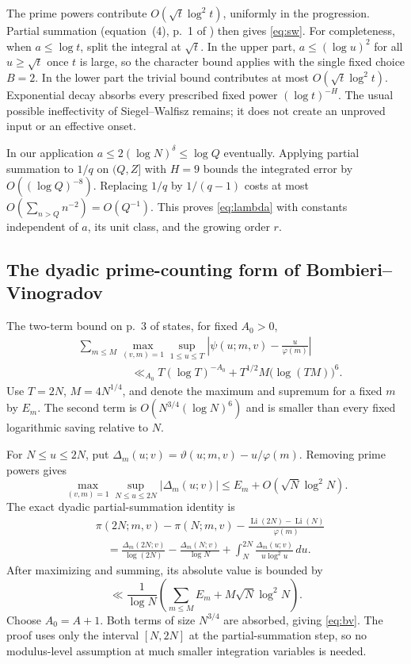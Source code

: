 \documentclass[11pt]{article}
\theoremstyle{remark}\newtheorem{remark}[theorem]{Remark}
\newcommand{\Li}{\operatorname{Li}}
\begin{document}
The prime powers contribute $O(\sqrt t\log^2t)$, uniformly in the
progression. Partial summation (equation~(4), p.~1 of \cite{VaughanBV})
then gives \eqref{eq:sw}. For completeness, when $a\le\log t$, split
the integral at $\sqrt t$. In the upper part, $a\le(\log u)^2$ for
all $u\ge\sqrt t$ once $t$ is large, so the character bound applies
with the single fixed choice $B=2$. In the lower part the trivial bound
contributes at most $O(\sqrt t\log^2t)$. Exponential decay absorbs
every prescribed fixed power $(\log t)^{-H}$. The usual possible
ineffectivity of Siegel--Walfisz remains; it does not create an unproved
input or an effective onset.

In our application $a\le2(\log N)^\delta\le\log Q$ eventually.
Applying partial summation to $1/q$ on $(Q,Z]$ with $H=9$ bounds the
integrated error by $O((\log Q)^{-8})$. Replacing $1/q$ by
$1/(q-1)$ costs at most $O(\sum_{n>Q}n^{-2})=O(Q^{-1})$.
This proves \eqref{eq:lambda} with constants independent of $a$, its
unit class, and the growing order $r$.

\subsection{The dyadic prime-counting form of Bombieri--Vinogradov}
The two-term bound on p.~3 of \cite{VaughanBV} states, for fixed $A_0>0$,
\begin{align*}
 &\sum_{m\le M}\max_{(v,m)=1}\sup_{1\le u\le T}
   \left|\psi(u;m,v)-\frac{u}{\varphi(m)}\right|\\
 &\hspace{2cm}\ll_{A_0}
    T(\log T)^{-A_0}+T^{1/2}M\bigl(\log(TM)\bigr)^6.
\end{align*}
Use $T=2N$, $M=4N^{1/4}$, and denote the maximum and supremum
for a fixed $m$ by $E_m$. The second term is
$O(N^{3/4}(\log N)^6)$ and is smaller than every fixed logarithmic
saving relative to $N$.

For $N\le u\le2N$, put
$\Delta_m(u;v)=\vartheta(u;m,v)-u/\varphi(m)$. Removing prime powers
gives
\[
 \max_{(v,m)=1}\sup_{N\le u\le2N}|\Delta_m(u;v)|
       \le E_m+O(\sqrt N\log^2N).
\]
The exact dyadic partial-summation identity is
\begin{align*}
 &\pi(2N;m,v)-\pi(N;m,v)
       -\frac{\Li(2N)-\Li(N)}{\varphi(m)}\\
 &\quad=\frac{\Delta_m(2N;v)}{\log(2N)}
       -\frac{\Delta_m(N;v)}{\log N}
       +\int_N^{2N}\frac{\Delta_m(u;v)}{u\log^2u}\,du.
\end{align*}
After maximizing and summing, its absolute value is bounded by
\[
 \ll\frac1{\log N}\left(\sum_{m\le M}E_m
                           +M\sqrt N\log^2N\right).
\]
Choose $A_0=A+1$. Both terms of size $N^{3/4}$ are absorbed, giving
\eqref{eq:bv}. The proof uses only the interval $[N,2N]$ at the
partial-summation step, so no modulus-level assumption at much smaller
integration variables is needed.
\end{document}
